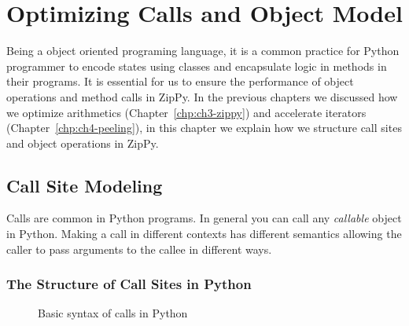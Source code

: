 \chapter{Optimizing Calls and Object Model}
\label{chp:ch5-object}

Being a object oriented programing language, it is a common practice for Python programmer to encode states using classes and encapsulate logic in methods in their programs.
It is essential for us to ensure the performance of object operations and method calls in ZipPy.
In the previous chapters we discussed how we optimize arithmetics (Chapter~\ref{chp:ch3-zippy}) and accelerate iterators (Chapter~\ref{chp:ch4-peeling}),
in this chapter we explain how we structure call sites and object operations in ZipPy.

\section{Call Site Modeling}

Calls are common in Python programs.
In general you can call any \emph{callable} object in Python.
Making a call in different contexts has different semantics allowing the caller to pass arguments to the callee in different ways.

\subsection{The Structure of Call Sites in Python}

\begin{figure}
\centering
{}
\caption{Basic syntax of calls in Python}
\label{fig:ch4-call-site-synteax-code}
\end{figure}

